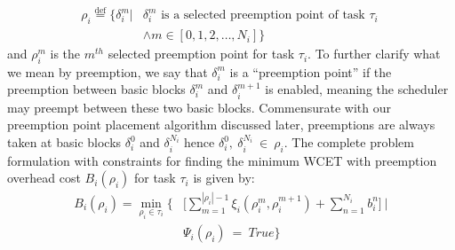 \begin{equation*}\label{eqn:pp-set}
\begin{split}
   \rho_{i} \stackrel{\text{def}}{=} \{\delta_{i}^{m}|&\delta_{i}^{m} \text{ is a selected preemption point of task } \tau_{i}\ \\ &\wedge m \in [0, 1, 2, \ldots, N_{i}]\}
\end{split}
\end{equation*}
%
\noindent
and \begin{math}\rho_{i}^{m}\end{math} is the \textrm{$m^{th}$} selected preemption point for task \begin{math}\tau_{i}\end{math}.  To further clarify what we mean by preemption, we say that $\delta_i^m$ is a ``preemption point'' if the preemption between basic blocks $\delta_i^m$ and $\delta_i^{m+1}$ is enabled, meaning the scheduler may preempt between these two basic blocks.  Commensurate with our preemption point placement algorithm discussed later, preemptions are always taken at basic blocks $\delta_i^0$ and $\delta_i^{N_i}$ hence $\delta_i^0,\ \delta_i^{N_i}\ \in\ \rho_{i}$.
%
\noindent
The complete problem formulation with constraints for finding the minimum WCET with preemption overhead cost \begin{math}B_{i}(\rho_{i})\end{math} for task \begin{math}\tau_{i}\end{math} is given by:
\begin{equation}\label{eqn:global-bbkwcet-cost}
\begin{split}
   B_{i}(\rho_{i}) = \min_{\rho_{i} \in \tau_{i}} \Big\{&\Big[\sum_{m=1}^{|\rho_{i}|-1} \xi_{i}(\rho_{i}^{m},\rho_{i}^{m+1}) + \sum_{n=1}^{N_i}b_{i}^{n}\Big]\ |\\
   &\Psi_{i}(\rho_{i})\ =\ True\Big\}
\end{split}
\end{equation}
